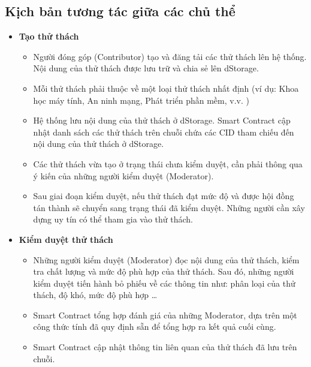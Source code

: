 \subsection{Kịch bản tương tác giữa các chủ thể}
\begin{itemize}
  \item \textbf{Tạo thử thách}
        \begin{itemize}
          \item Người đóng góp (Contributor) tạo và đăng tải các thử thách lên hệ thống. Nội dung của thử thách được lưu trữ và chia sẻ lên dStorage.
          \item Mỗi thử thách phải thuộc về một loại thử thách nhất định (ví dụ: Khoa học máy tính, An ninh mạng, Phát triển phần mềm, v.v. )
          \item Hệ thống lưu nội dung của thử thách ở dStorage. Smart Contract cập nhật danh sách các thử thách trên chuỗi chứa các CID tham chiếu đến nội dung của thử thách ở dStorage.
          \item Các thử thách vừa tạo ở trạng thái chưa kiểm duyệt, cần phải thông qua ý kiến của những người kiểm duyệt (Moderator).
          \item Sau giai đoạn kiểm duyệt, nếu thử thách đạt mức độ và được hội đồng tán thành sẽ chuyển sang trạng thái đã kiểm duyệt. Những người cần xây dựng uy tín có thể tham gia vào thử thách.
        \end{itemize}

  \item \textbf{Kiểm duyệt thử thách}
        \begin{itemize}
          \item Những người kiểm duyệt (Moderator) đọc nội dung của thử thách, kiểm tra chất lượng và mức độ phù hợp của thử thách. Sau đó, những người kiểm duyệt tiến hành bỏ phiếu về các thông tin như: phân loại của thử thách, độ khó, mức độ phù hợp \dots
          \item Smart Contract tổng hợp đánh giá của những Moderator, dựa trên một công thức tính đã quy định sẵn để tổng hợp ra kết quả cuối cùng.
          \item Smart Contract cập nhật thông tin liên quan của thử thách đã lưu trên chuỗi.
        \end{itemize}


\end{itemize}
